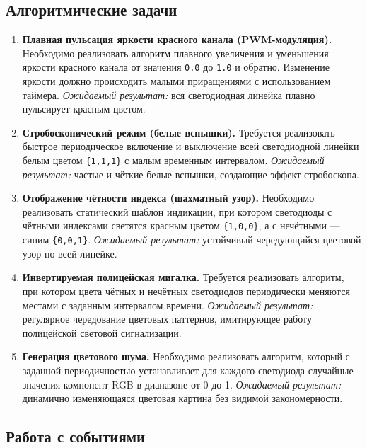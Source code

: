 \subsection{Алгоритмические задачи}

\begin{enumerate}[resume]
  \item \textbf{Плавная пульсация яркости красного канала (PWM-модуляция).}  
  Необходимо реализовать алгоритм плавного увеличения и уменьшения яркости красного канала от значения \verb|0.0| до \verb|1.0| и обратно. Изменение яркости должно происходить малыми приращениями с использованием таймера.  
  \textit{Ожидаемый результат:} вся светодиодная линейка плавно пульсирует красным цветом.

  \item \textbf{Стробоскопический режим (белые вспышки).}  
  Требуется реализовать быстрое периодическое включение и выключение всей светодиодной линейки белым цветом \verb|{1,1,1}| с малым временным интервалом.  
  \textit{Ожидаемый результат:} частые и чёткие белые вспышки, создающие эффект стробоскопа.

  \item \textbf{Отображение чётности индекса (шахматный узор).}  
  Необходимо реализовать статический шаблон индикации, при котором светодиоды с чётными индексами светятся красным цветом \verb|{1,0,0}|, а с нечётными — синим \verb|{0,0,1}|.  
  \textit{Ожидаемый результат:} устойчивый чередующийся цветовой узор по всей линейке.

  \item \textbf{Инвертируемая полицейская мигалка.}  
  Требуется реализовать алгоритм, при котором цвета чётных и нечётных светодиодов периодически меняются местами с заданным интервалом времени.  
  \textit{Ожидаемый результат:} регулярное чередование цветовых паттернов, имитирующее работу полицейской световой сигнализации.

  \item \textbf{Генерация цветового шума.}  
  Необходимо реализовать алгоритм, который с заданной периодичностью устанавливает для каждого светодиода случайные значения компонент RGB в диапазоне от 0 до 1.  
  \textit{Ожидаемый результат:} динамично изменяющаяся цветовая картина без видимой закономерности.
\end{enumerate}

\subsection{Работа с событиями}

